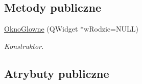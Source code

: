 \subsection*{Metody publiczne}
\begin{DoxyCompactItemize}
\item 
\hyperlink{class_okno_glowne_a8dcfe4e0f18dfaf0c535c4549991b550}{Okno\-Glowne} (Q\-Widget $\ast$w\-Rodzic=N\-U\-L\-L)
\begin{DoxyCompactList}\small\item\em Konstruktor. \end{DoxyCompactList}\end{DoxyCompactItemize}
\subsection*{Atrybuty publiczne}
